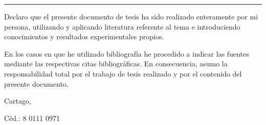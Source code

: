 \thispagestyle{empty}

\rule{10mm}{0pt}

\vfill


Declaro que el presente documento de tesis ha sido realizado enteramente por mi
persona, utilizando y aplicando literatura referente al tema e introduciendo
conocimientos y resultados experimentales propios.

En los casos en que he utilizado bibliografía he procedido a indicar las fuentes
mediante las respectivas citas bibliográficas.  En consecuencia, asumo la
responsabilidad total por el trabajo de tesis realizado y por el contenido del
presente documento.

\vspace*{8mm}

\begin{flushright}
  \scriptAuthor\par
  Cartago, \fechaDefensa\par
  Céd.: 8 0111 0971
\end{flushright}

\vspace*{8mm}

\begin{center}
	\doclicenseThis
\end{center}

\cleardoublepage

